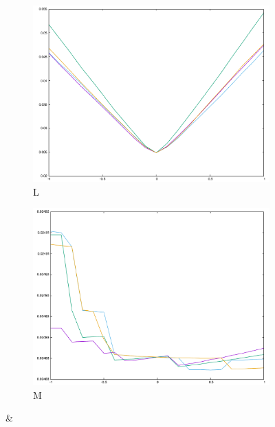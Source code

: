 {\begin{figure}[H]
\begin{subfigure}{.33\textwidth}
\end{subfigure}\\
\begin{subfigure}{.33\textwidth}
	\includegraphics[width=\linewidth]{fig/ajherr/t3r/L_mae.pdf}
	\caption{L}
\end{subfigure}%
\begin{subfigure}{.33\textwidth}
	\includegraphics[width=\linewidth]{fig/ajherr/t3r/M_mae.pdf}
	\caption{M}
\end{subfigure}&
\begin{subfigure}{.33\textwidth}

\end{subfigure}
\end{figure}}
